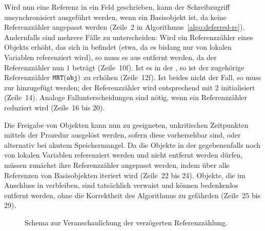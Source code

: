 Wird nun eine Referenz  in ein Feld  geschrieben, kann der Schreibzugriff unsynchronisiert ausgeführt werden, wenn  ein Basisobjekt ist, da keine Referenzzähler angepasst werden (Zeile~2 in Algorithmus~\ref{algo:deferred-rc}).
Andernfalls sind mehrere Fälle zu unterscheiden:
Wird ein Referenzzähler eines Objekts  erhöht, das sich in  befindet (etwa, da es bislang nur von lokalen Variablen referenziert wird), so muss es aus  entfernt werden, da der Referenzzähler nun $1$ beträgt (Zeile~10f).
Ist es in der , so ist der zugehörige Referenzzähler $\texttt{MRT}(\texttt{obj})$ zu erhöhen (Zeile~12f).
Ist beides nicht der Fall, so muss  zur  hinzugefügt werden; der Referenzzähler wird entsprechend mit $2$ initialisiert (Zeile~14).
Analoge Fallunterscheidungen sind nötig, wenn ein Referenzzähler reduziert wird (Zeile~16 bis 20).

Die Freigabe von Objekten kann nun zu geeigneten, unkritischen Zeitpunkten mittels der Prozedur  ausgelöst werden, sofern diese vorhersehbar sind, oder alternativ bei akutem Speichermangel.
Da die Objekte in der  gegebenenfalls noch von lokalen Variablen referenziert werden und nicht entfernt werden dürfen, müssen zunächst ihre Referenzzähler angepasst werden, indem über alle Referenzen von Basisobjekten iteriert wird (Zeile~22 bis 24).
Objekte, die im Anschluss in  verbleiben, sind tatsächlich verwaist und können bedenkenlos entfernt werden, ohne die Korrektheit des Algorithmus zu gefährden (Zeile~25 bis 29).

\begin{figure}[h]
	\centering
	
	\caption[Veranschaulichung der verzögerten Referenzzählung]{Schema zur Veranschaulichung der verzögerten Referenzzählung.}
	\label{fig:rc-deferred}
\end{figure}

